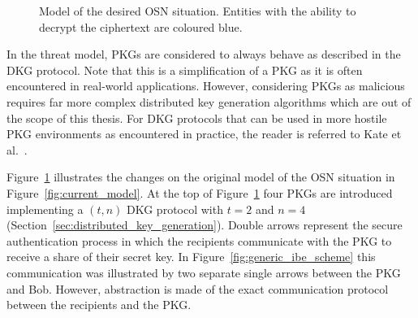 \begin{figure}[ht]
\begin{center}
{
    }
    \end{center}
    \caption{Model of the desired OSN situation. Entities with the ability to decrypt the ciphertext are coloured blue.}
    \label{fig:new_model}
\end{figure}

In the threat model, PKGs are considered to always behave as described in the DKG protocol. Note that this is a simplification of a PKG as it is often encountered in real-world applications. However, considering PKGs as malicious requires far more complex distributed key generation algorithms which are out of the scope of this thesis. For DKG protocols that can be used in more hostile PKG environments as encountered in practice, the reader is referred to Kate et al.~\cite{art:KateHG12}.

Figure~\ref{fig:new_model} illustrates the changes on the original model of the OSN situation in Figure~\ref{fig:current_model}. At the top of Figure~\ref{fig:new_model} four PKGs are introduced implementing a $\left( t, n \right)$ DKG protocol with $t = 2$ and $n = 4$ (Section~\ref{sec:distributed_key_generation}). Double arrows represent the secure authentication process in which the recipients communicate with the PKG to receive a share of their secret key. In Figure~\ref{fig:generic_ibe_scheme} this communication was illustrated by two separate single arrows between the PKG and Bob. However, abstraction is made of the exact communication protocol between the recipients and the PKG.

